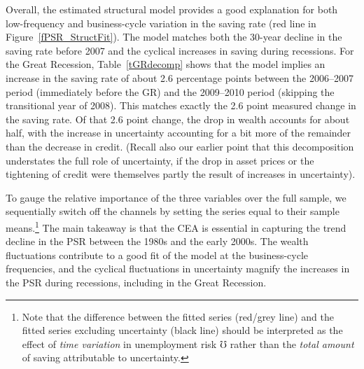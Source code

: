 \documentclass[titlepage]{\econtex}
\begin{document}
Overall, the estimated structural model provides a good explanation for both low-frequency and business-cycle variation in the saving rate (red line in Figure~\ref{fPSR_StructFit}). The model matches both the 30-year decline in the saving rate before 2007 and the cyclical increases in saving during recessions. For the Great Recession, Table~\ref{tGRdecomp} shows that the model implies an increase in the saving rate of about 2.6 percentage points between the 2006--2007 period (immediately before the GR) and the 2009--2010 period (skipping the transitional year of 2008).  This matches exactly the 2.6 point measured change in the saving rate.  Of that 2.6 point change, the drop in wealth accounts for about half, with the increase in uncertainty accounting for a bit more of the remainder than the decrease in credit.  (Recall also our earlier point that this decomposition understates the full role of uncertainty, if the drop in asset prices or the tightening of credit were themselves partly the result of increases in uncertainty).

To gauge the relative importance of the three variables over the full sample, we sequentially switch off the channels by setting the series equal to their sample means.\footnote{Note that the difference between the fitted series  (red/grey line) and the fitted series excluding uncertainty (black line) should be interpreted as the effect of \emph{time variation} in unemployment risk $\mho$ rather than the \emph{total amount} of saving attributable to uncertainty.} The main takeaway is that the CEA is essential in capturing the trend decline in the PSR between the 1980s and the early 2000s. The wealth fluctuations contribute to a good fit of the model at the business-cycle frequencies, and the cyclical fluctuations in uncertainty magnify the increases in the PSR during recessions, including in the Great Recession.

\hypertarget{The-MPC}{}
\end{document}
